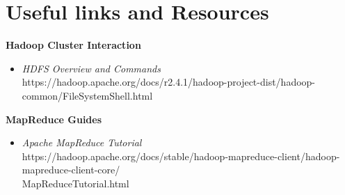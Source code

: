 \documentclass{article}
\begin{document}
\section{Useful links and Resources}
\textbf{Hadoop Cluster Interaction}
\begin{itemize}
    \item \textit{HDFS Overview and Commands}\\ https://hadoop.apache.org/docs/r2.4.1/hadoop-project-dist/hadoop-common/FileSystemShell.html
\end{itemize}
\textbf{MapReduce Guides}
\begin{itemize}
    \item \textit{Apache MapReduce Tutorial}\\ https://hadoop.apache.org/docs/stable/hadoop-mapreduce-client/hadoop-mapreduce-client-core/\\MapReduceTutorial.html
\end{itemize} 



\-\\\\\\\\\\\\\noindent \date{Last Updated: \today}


%
\end{document}
